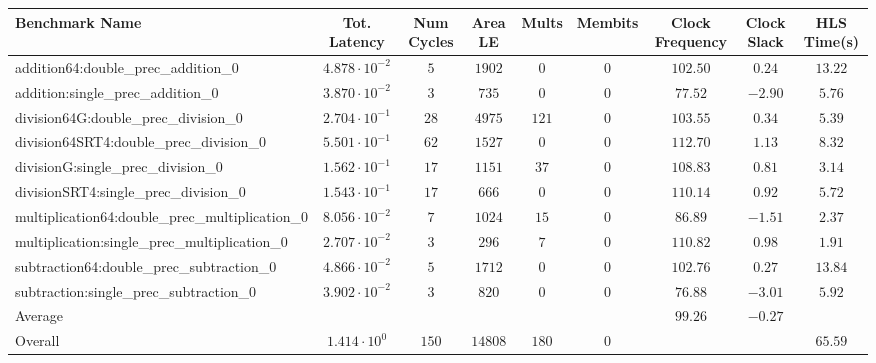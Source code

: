 \begin{tabular}{|l|c|c|c|c|c|c|c|c|}
\hline
Benchmark Name                                   & Tot. Latency            & Num Cycles & Area LE   & Mults   & Membits & Clock Frequency & Clock Slack & HLS Time(s) \\
\hline
addition64:double\_prec\_addition\_0             & $ 4.878 \cdot 10^{-2} $ & $ 5      $ & $ 1902  $ & $ 0   $ & $ 0   $ & $ 102.50      $ & $ 0.24    $ & $ 13.22   $ \\
addition:single\_prec\_addition\_0               & $ 3.870 \cdot 10^{-2} $ & $ 3      $ & $ 735   $ & $ 0   $ & $ 0   $ & $ 77.52       $ & $ -2.90   $ & $ 5.76    $ \\
division64G:double\_prec\_division\_0            & $ 2.704 \cdot 10^{-1} $ & $ 28     $ & $ 4975  $ & $ 121 $ & $ 0   $ & $ 103.55      $ & $ 0.34    $ & $ 5.39    $ \\
division64SRT4:double\_prec\_division\_0         & $ 5.501 \cdot 10^{-1} $ & $ 62     $ & $ 1527  $ & $ 0   $ & $ 0   $ & $ 112.70      $ & $ 1.13    $ & $ 8.32    $ \\
divisionG:single\_prec\_division\_0              & $ 1.562 \cdot 10^{-1} $ & $ 17     $ & $ 1151  $ & $ 37  $ & $ 0   $ & $ 108.83      $ & $ 0.81    $ & $ 3.14    $ \\
divisionSRT4:single\_prec\_division\_0           & $ 1.543 \cdot 10^{-1} $ & $ 17     $ & $ 666   $ & $ 0   $ & $ 0   $ & $ 110.14      $ & $ 0.92    $ & $ 5.72    $ \\
multiplication64:double\_prec\_multiplication\_0 & $ 8.056 \cdot 10^{-2} $ & $ 7      $ & $ 1024  $ & $ 15  $ & $ 0   $ & $ 86.89       $ & $ -1.51   $ & $ 2.37    $ \\
multiplication:single\_prec\_multiplication\_0   & $ 2.707 \cdot 10^{-2} $ & $ 3      $ & $ 296   $ & $ 7   $ & $ 0   $ & $ 110.82      $ & $ 0.98    $ & $ 1.91    $ \\
subtraction64:double\_prec\_subtraction\_0       & $ 4.866 \cdot 10^{-2} $ & $ 5      $ & $ 1712  $ & $ 0   $ & $ 0   $ & $ 102.76      $ & $ 0.27    $ & $ 13.84   $ \\
subtraction:single\_prec\_subtraction\_0         & $ 3.902 \cdot 10^{-2} $ & $ 3      $ & $ 820   $ & $ 0   $ & $ 0   $ & $ 76.88       $ & $ -3.01   $ & $ 5.92    $ \\
\hline
Average                                          & $                     $ & $        $ & $       $ & $     $ & $     $ & $ 99.26       $ & $ -0.27   $ & $         $ \\
\hline
Overall                                          & $ 1.414 \cdot 10^{0}  $ & $ 150    $ & $ 14808 $ & $ 180 $ & $ 0   $ & $             $ & $         $ & $ 65.59   $ \\
\hline
\end{tabular}
